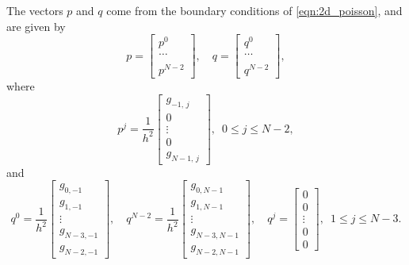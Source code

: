 

The vectors $p$ and $q$ come from the boundary conditions of \eqref{eqn:2d_poisson}, and are given by 
\[p = \begin{bmatrix} p^0 \\ \ldots \\ \\ p^{N-2} \end{bmatrix}, \quad  q = \begin{bmatrix} q^0 \\ \ldots \\ \\ q^{N-2} \end{bmatrix},\]
where 
\[p^j = \frac{1}{h^2} \begin{bmatrix} g_{-1,\,j} \\ 0 \\ \vdots \\0\\ g_{N-1,\,j} \end{bmatrix} ,\,\,\, 0 \leq j \leq N-2,\]
and 
\[q^0 = \frac{1}{h^2}\begin{bmatrix} g_{0,-1}  \\ g_{1,-1} \\ \vdots \\ g_{N-3,-1}\\ g_{N-2,-1} \end{bmatrix}, \quad q^{N-2} = \frac{1}{h^2}\begin{bmatrix} g_{0,N-1} \\ g_{1,N-1} \\ \vdots \\ g_{N-3,N-1}\\ g_{N-2,N-1} \end{bmatrix}, \quad q^{j} = \begin{bmatrix} 0 \\ 0 \\ \vdots \\ 0 \\ 0 \end{bmatrix} ,\,\,\, 1 \leq j \leq N-3.\]

